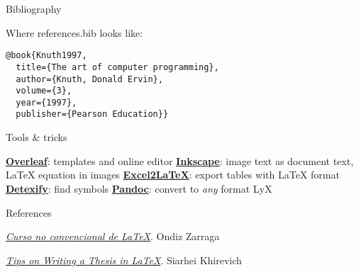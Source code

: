 \begin{frame}[fragile]{Bibliography}

Where {\inconsolatafont references.bib} looks like:

\begin{lstlisting}[breaklines=false]
@book{Knuth1997,
  title={The art of computer programming},
  author={Knuth, Donald Ervin},
  volume={3},
  year={1997},
  publisher={Pearson Education}}
\end{lstlisting}
\end{frame}

\begin{frame}{Tools \& tricks}
 \begin{fullpageitemize}
  \itemR \href{https://www.overleaf.com/}{\textbf{Overleaf}}: templates and online editor
  \itemR \href{http://wiki.inkscape.org/wiki/index.php/LaTeX}{\textbf{Inkscape}}: image text as document text, LaTeX equation in images
  \itemR \href{https://www.ctan.org/tex-archive/support/excel2latex/}{\textbf{Excel2LaTeX}}: export tables with LaTeX format
  \itemR \href{http://detexify.kirelabs.org/classify.html}{\textbf{Detexify}}: find symbols
  \itemR \href{http://pandoc.org/}{\textbf{Pandoc}}: convert to \emph{any} format
  \itemR LyX
\end{fullpageitemize}
 
\end{frame}

\begin{frame}{References}
 \begin{fullpageitemize}
	\itemR\href{https://ondiz.github.io/cursoLatex/}{\emph{Curso no convencional de LaTeX}}. Ondiz Zarraga

	\itemR \href{http://www.khirevich.com/latex/}{\emph{Tips on Writing a Thesis in LaTeX}}. Siarhei Khirevich
 \end{fullpageitemize}
\end{frame}

